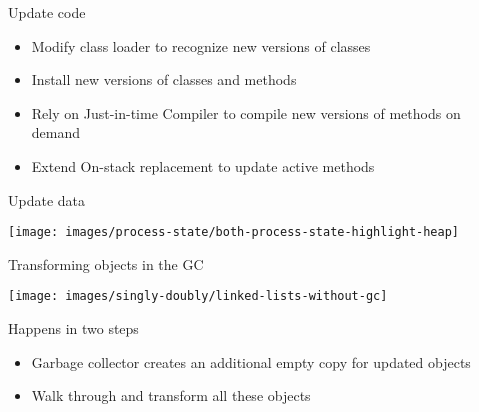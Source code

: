 \begin{frame}{Update code}%
\begin{itemize}
\item Modify class loader to recognize new versions of classes
\item Install new versions of classes and methods
\item Rely on Just-in-time Compiler to compile new versions of methods on
demand
\item Extend On-stack replacement to update active methods
\end{itemize}
\end{frame}

\begin{frame}{Update data}%
\vspace*{-3mm}%
\begin{center}%
\texttt{[image: images/process-state/both-process-state-highlight-heap]}%
\end{center}%
\end{frame}



\begin{frame}[t]{Transforming objects in the GC}%
\vspace*{-6ex}
\begin{center}
\texttt{[image: images/singly-doubly/linked-lists-without-gc]}%
\end{center}
Happens in two steps \\
\begin{itemize}
\item Garbage collector creates an additional empty copy for updated objects
\item Walk through and transform all these objects
\end{itemize}
\end{frame}

